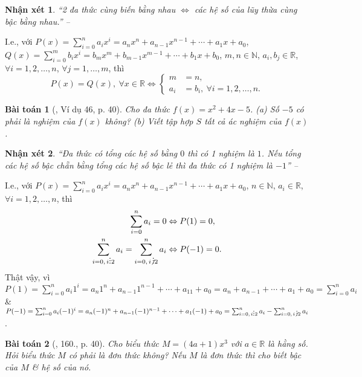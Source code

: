 \documentclass{article}
\newtheorem{baitoan}{Bài toán}
\newtheorem{nhanxet}{Nhận xét}
\DeclareRobustCommand{\divby}{%
	\mathrel{\vbox{\baselineskip.65ex\lineskiplimit0pt\hbox{.}\hbox{.}\hbox{.}}}%
}
\begin{document}
\begin{nhanxet}
	``2 đa thức cùng biến bằng nhau $\Leftrightarrow$ các hệ số của lũy thừa cùng bậc bằng nhau.'' -- \cite[p. 40]{Tuyen_Toan_7}
\end{nhanxet}
I.e., với $P(x) = \sum_{i=0}^n a_ix^i = a_nx^n + a_{n-1}x^{n-1} + \cdots + a_1x + a_0$, $Q(x) = \sum_{i=0}^m b_ix^i = b_mx^m + b_{m-1}x^{m-1} + \cdots + b_1x + b_0$, $m,n\in\mathbb{N}$, $a_i,b_j\in\mathbb{R}$, $\forall i = 1,2,\ldots,n$, $\forall j = 1,\ldots,m$, thì
\begin{equation*}
	P(x) = Q(x),\ \forall x\in\mathbb{R}\Leftrightarrow\left\{\begin{split}
		m &= n,\\
		a_i &= b_i,\ \forall i = 1,2,\ldots,n.
	\end{split}\right.
\end{equation*}

\begin{baitoan}[\cite{Tuyen_Toan_7}, Ví dụ 46, p. 40]
	Cho đa thức $f(x) = x^2 + 4x - 5$. (a) Số $-5$ có phải là nghiệm của $f(x)$ không? (b) Viết tập hợp $S$ tất cả ác nghiệm của $f(x)$.
\end{baitoan}

\begin{nhanxet}
	``Đa thức có tổng các hệ số bằng $0$ thì có 1 nghiệm là $1$. Nếu tổng các hệ số bậc chẵn bằng tổng các hệ số bậc lẻ thì đa thức có 1 nghiệm là $-1$'' -- \cite[p. 40]{Tuyen_Toan_7}
\end{nhanxet}
I.e., với $P(x) = \sum_{i=0}^n a_ix^i = a_nx^n + a_{n-1}x^{n-1} + \cdots + a_1x + a_0$, $n\in\mathbb{N}$, $a_i\in\mathbb{R}$, $\forall i = 1,2,\ldots,n$, thì
\begin{align*}
	\sum_{i=0}^n a_i = 0&\Leftrightarrow P(1) = 0,\\
	\sum_{i=0,\,i\divby 2}^n a_i = \sum_{i=0,\,i\not\,\divby 2}^n a_i&\Leftrightarrow P(-1) = 0.
\end{align*}
Thật vậy, vì $P(1) = \sum_{i=0}^n a_i1^i = a_n1^n + a_{n-1}1^{n-1} + \cdots + a_11 + a_0 = a_n + a_{n-1} + \cdots + a_1 + a_0 = \sum_{i=0}^n a_i$ \& $P(-1) = \sum_{i=0}^n a_i(-1)^i = a_n(-1)^n + a_{n-1}(-1)^{n-1} + \cdots + a_1(-1) + a_0 = \sum_{i=0,\,i\divby 2}^n a_i - \sum_{i=0,\,i\not\,\divby 2}^n a_i$.

\begin{baitoan}[\cite{Tuyen_Toan_7}, 160., p. 40]
	Cho biểu thức $M = (4a + 1)x^3$ với $a\in\mathbb{R}$ là hằng số. Hỏi biểu thức $M$ có phải là đơn thức không? Nếu $M$ là đơn thức thì cho biết bậc của $M$ \& hệ số của nó.
\end{baitoan}
\end{document}
